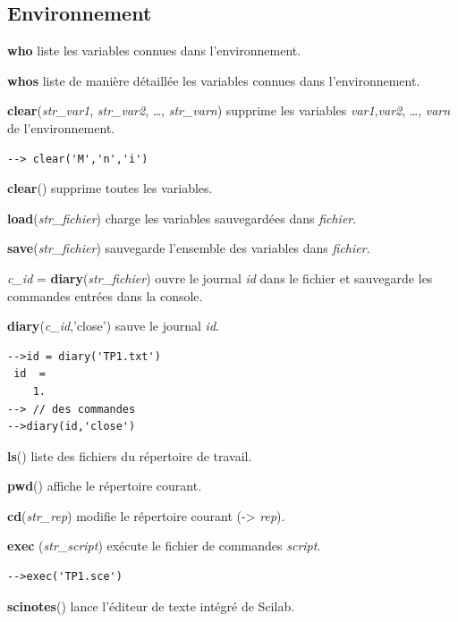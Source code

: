 \documentclass{article}
\begin{document}
\begin{multicols}{3}
\subsection{Environnement}
\label{environnement}
\begin{description}
\item{\textbf{who}} liste les variables connues dans l'environnement.
\item{\textbf{whos}} liste de manière détaillée les variables connues dans l'environnement.      
\item{\textbf{clear}(\textit{str\_var1}, \textit{str\_var2}, \ldots, \textit{str\_varn})} supprime les variables \textit{var1},\textit{var2}, \ldots, \textit{varn} de l'environnement.
\begin{verbatim}--> clear('M','n','i')\end{verbatim}
\item{\textbf{clear}()} supprime toutes les variables.
\item{\textbf{load}(\textit{str\_fichier})} charge les variables sauvegardées dans \textit{fichier}.
\item{\textbf{save}(\textit{str\_fichier})} sauvegarde l'ensemble des variables dans \textit{fichier}.
\item{\textit{c\_id} = \textbf{diary}(\textit{str\_fichier})} ouvre le journal \textit{id} dans le fichier et sauvegarde les commandes entrées dans la console.
\item{\textbf{diary}(\textit{c\_id},'close')} sauve le journal \textit{id}.
\begin{verbatim}
-->id = diary('TP1.txt')
 id  =
    1.  
--> // des commandes
-->diary(id,'close')
\end{verbatim}
\item{\textbf{ls}()} liste des fichiers du répertoire de travail.
\item{\textbf{pwd}()} affiche le répertoire courant.
\item{\textbf{cd}(\textit{str\_rep})} modifie le répertoire courant (-> \textit{rep}).
\item{\textbf{exec} (\textit{str\_script})} exécute le fichier de commandes \textit{script}.
\begin{verbatim}
-->exec('TP1.sce')
\end{verbatim}
\item{\textbf{scinotes}()} lance l'éditeur de texte intégré de Scilab.
\end{description}

\end{multicols}
\end{document}
